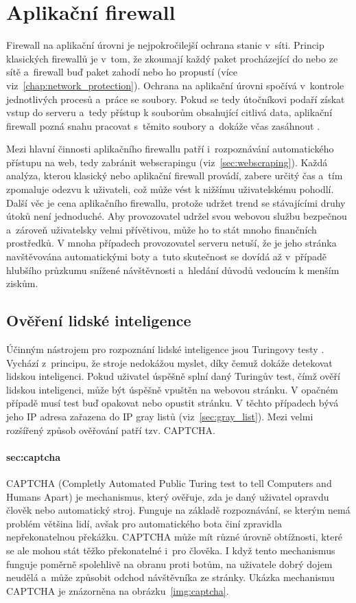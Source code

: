 \chapter{Aplikační firewall}
\label{chap:application_firewall}
Firewall na aplikační úrovni je nejpokročilejší ochrana stanic v~síti. Princip klasických firewallů je v~tom, že zkoumají každý paket procházející do nebo ze sítě a~firewall buď paket zahodí nebo ho propustí (více viz~\ref{chap:network_protection}). Ochrana na aplikační úrovni spočívá v~kontrole jednotlivých procesů a~práce se soubory. Pokud se tedy útočníkovi podaří získat vstup do serveru a~tedy přístup k souborům obsahující citlivá data, aplikační firewall pozná snahu pracovat s~těmito soubory a~dokáže včas zasáhnout \cite{bib:aplikacni_fw}.

Mezi hlavní činnosti aplikačního firewallu patří i~rozpoznávání automatického přístupu na web, tedy zabránit webscrapingu (viz~\ref{sec:webscraping}). Každá analýza, kterou klasický nebo aplikační firewall provádí, zabere určitý čas a~tím zpomaluje odezvu k uživateli, což může vést k nižšímu uživatelskému pohodlí. Další věc je cena aplikačního firewallu, protože udržet trend se stávajícími druhy útoků není jednoduché. Aby provozovatel udržel svou webovou službu bezpečnou a~zároveň uživatelsky velmi přívětivou, může ho to stát mnoho finančních prostředků. V mnoha případech provozovatel serveru netuší, že je jeho stránka navštěvována automatickými boty a~tuto skutečnost se dovídá až v~případě hlubšího průzkumu snížené návštěvnosti a~hledání důvodů vedoucím k menším ziskům.

\section{Ověření lidské inteligence}
Účinným nástrojem pro rozpoznání lidské inteligence jsou Turingovy testy \cite{bib:intelligence_detect}. Vychází z~principu, že stroje nedokážou myslet, díky čemuž dokáže detekovat lidskou inteligenci. Pokud uživatel úspěšně splní daný Turingův test, čímž ověří lidskou inteligenci, může být úspěšně vpuštěn na webovou stránku. V opačném případě musí test buď opakovat nebo opustit stránku. V těchto případech bývá jeho IP adresa zařazena do IP gray listů (viz~\ref{sec:gray_list}). Mezi velmi rozšířený způsob ověřování patří tzv. CAPTCHA.

\subsubsection*{sec:captcha}
\label{sec:captcha}
CAPTCHA (Completly Automated Public Turing test to tell Computers and Humans Apart) je mechanismus, který ověřuje, zda je daný uživatel opravdu člověk nebo automatický stroj. Funguje na základě rozpoznávání, se kterým nemá problém většina lidí, avšak pro automatického bota činí zpravidla nepřekonatelnou překážku. CAPTCHA může mít různé úrovně obtížnosti, které se ale mohou stát těžko překonatelné i~pro člověka. I když tento mechanismus funguje poměrně spolehlivě na obranu proti botům, na uživatele dobrý dojem neudělá a~může způsobit odchod návštěvníka ze stránky. Ukázka mechanismu CAPTCHA je znázorněna na obrázku~\ref{img:captcha}.

